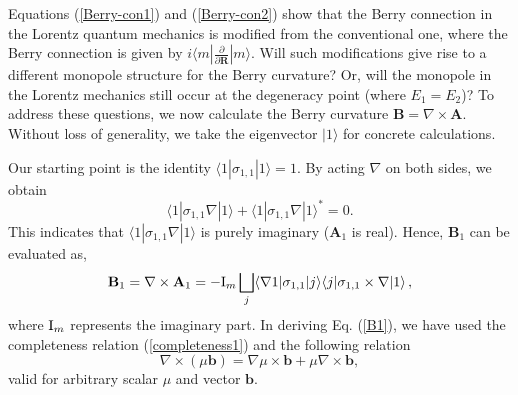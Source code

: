 \documentclass[pra,epsfig,rotate,superscriptaddress,showpacs]{revtex4}
\begin{document}
Equations (\ref{Berry-con1}) and (\ref{Berry-con2}) show that the Berry connection in the Lorentz quantum mechanics is modified from the conventional one, where the Berry connection is given by $i\langle m|\frac{\partial}{\partial \mathbf{R}}|m\rangle$. Will such modifications give rise to a different monopole structure for the Berry curvature? Or, will the monopole in the Lorentz mechanics still occur at the degeneracy point (where $E_1=E_2$)?  To address these questions, we now calculate the Berry curvature $\mathbf{B}=\nabla\times \mathbf{A}$. Without loss of generality, we take the eigenvector $|1\rangle$ for concrete calculations.

Our starting point is the identity $\langle 1 |\sigma_{1,1}|1\rangle=1$. By acting $\nabla$ on both sides, we obtain
\begin{equation}
\langle 1|\sigma_{1,1} \nabla |1\rangle+\langle 1|\sigma_{1,1} \nabla |1\rangle^*=0.
\end{equation}
This indicates that $\langle 1|\sigma_{1,1} \nabla |1\rangle$ is purely imaginary ($\mathbf{A}_1$ is real). Hence, $\mathbf{B}_1$ can be evaluated as,
\begin{equation} 
\mathbf{B}_1=\nabla\times \mathbf{A}_1
=-{\text I_m}\bigsqcup_j \langle \nabla1 |\sigma_{1,1}|j\rangle\langle j| \sigma_{1,1}\times\nabla |1\rangle\,, \label{B1}
\end{equation}
where ${\text I_m}$ represents the imaginary part.
In deriving  Eq. (\ref{B1}), we have used  the completeness relation (\ref{completeness1}) and the following relation
\begin{equation} \label{are}
\nabla\times(\mu \mathbf{b})=\nabla\mu\times\mathbf{b}+\mu\nabla\times\mathbf{b},
\end{equation}
valid for arbitrary scalar $\mu$ and vector $\mathbf{b}$.
\end{document}
